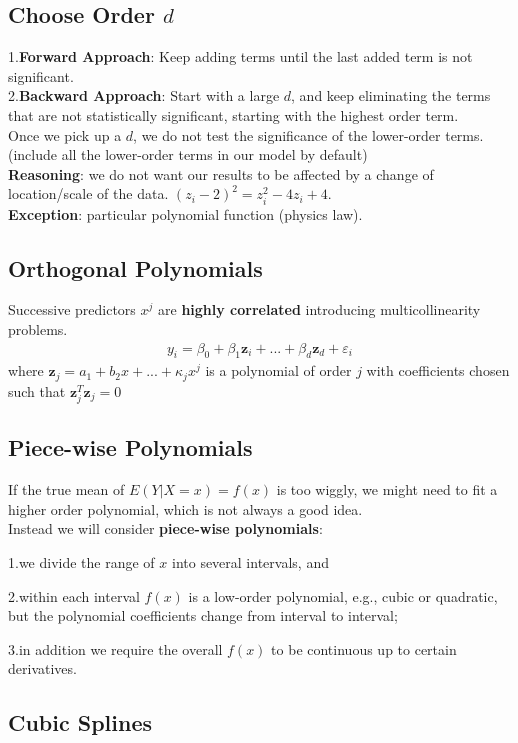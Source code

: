\documentclass[11pt,a4paper]{article}
\begin{document}
\subsection{Choose Order $d$}
1.\textbf{Forward Approach}: Keep adding terms until the last added term is not signiﬁcant.\\
2.\textbf{Backward Approach}: Start with a large $d$, and keep eliminating the terms that are not statistically signiﬁcant, starting with the highest order term.\\

Once we pick up a $d$, we do not test the signiﬁcance of the lower-order terms. (include all the lower-order terms in our model by default)\\
\textbf{Reasoning}: we do not want our results to be affected by a change of location/scale of the data. $(z_i-2)^2=z_i^2-4z_i+4$.\\
\textbf{Exception}: particular polynomial function (physics law).


\subsection{Orthogonal Polynomials}
Successive predictors $x^j$ are \textbf{highly correlated} introducing multicollinearity problems.
\begin{equation}
    \begin{aligned}
        y_i=\beta_0+\beta_1 \mathbf{z}_i+...+\beta_d \mathbf{z}_d+\varepsilon_i
    \end{aligned}
    \nonumber
\end{equation}
where $\mathbf{z}_j=a_1+b_2x+...+\kappa_j x^j$ is a polynomial of order $j$ with coefficients chosen such that $\mathbf{z}_j^T\mathbf{z}_j=0$

\subsection{Piece-wise Polynomials}
If the true mean of $E(Y | X = x) = f (x)$ is too wiggly, we might need to ﬁt a higher order polynomial, which is not always a good idea.\\

Instead we will consider \textbf{piece-wise polynomials}:

1.we divide the range of $x$ into several intervals, and

2.within each interval $f (x)$ is a low-order polynomial, e.g., cubic or quadratic, but the polynomial coeﬃcients change from interval to interval;

3.in addition we require the overall $f (x)$ to be continuous up to certain derivatives.

\subsection{Cubic Splines}
\end{document}
